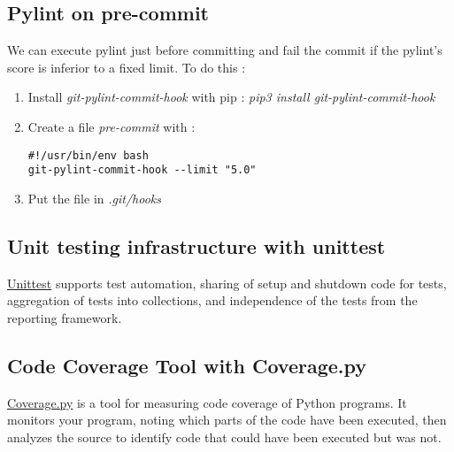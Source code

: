 \documentclass[a4paper]{report}
\begin{document}

\subsection{Pylint on pre-commit}
We can execute pylint just before committing and fail the commit if the pylint's score is inferior to a fixed limit. To do this : 
\begin{enumerate}
\item Install \textit{git-pylint-commit-hook} with pip : 
\emph{pip3 install git-pylint-commit-hook}
\item Create a file \emph{pre-commit} with : 
\begin{verbatim}
#!/usr/bin/env bash
git-pylint-commit-hook --limit "5.0"
\end{verbatim}
\item Put the file in \emph{.git/hooks}

\end{enumerate}


\subsection{Unit testing infrastructure with unittest}
\href{https://docs.python.org/3/library/unittest.html}{Unittest} supports test automation, sharing of setup and shutdown code for tests, aggregation of tests into collections, and independence of the tests from the reporting framework.




\subsection{Code Coverage Tool with Coverage.py}
\href{http://coverage.readthedocs.io/en/latest/}{Coverage.py} is a tool for measuring code coverage of Python programs. It monitors your program, noting which parts of the code have been executed, then analyzes the source to identify code that could have been executed but was not.
\end{document}
